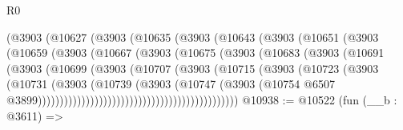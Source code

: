 \begin{lexlean}{R0}
\begin{coremodule}
                            (@3903
                              (@10627
                                (@3903
                                  (@10635
                                    (@3903
                                      (@10643
                                        (@3903
                                          (@10651
                                            (@3903
                                              (@10659
                                                (@3903
                                                  (@10667
                                                    (@3903
                                                      (@10675
                                                        (@3903
                                                          (@10683
                                                            (@3903
                                                              (@10691
                                                                (@3903
                                                                  (@10699
                                                                    (@3903
                                                                      (@10707
                                                                        (@3903
                                                                          (@10715
                                                                            (@3903
                                                                              (@10723
                                                                                (@3903
                                                                                  (@10731
                                                                                    (@3903
                                                                                      (@10739
                                                                                        (@3903
                                                                                          (@10747
                                                                                            (@3903
                                                                                              (@10754
                                                                                                @6507
                                                                                                @3899))))))))))))))))))))))))))))))))))))))))))))))
@10938 := @10522
    (fun (__b : @3611) =>

\end{coremodule}
\end{lexlean}
